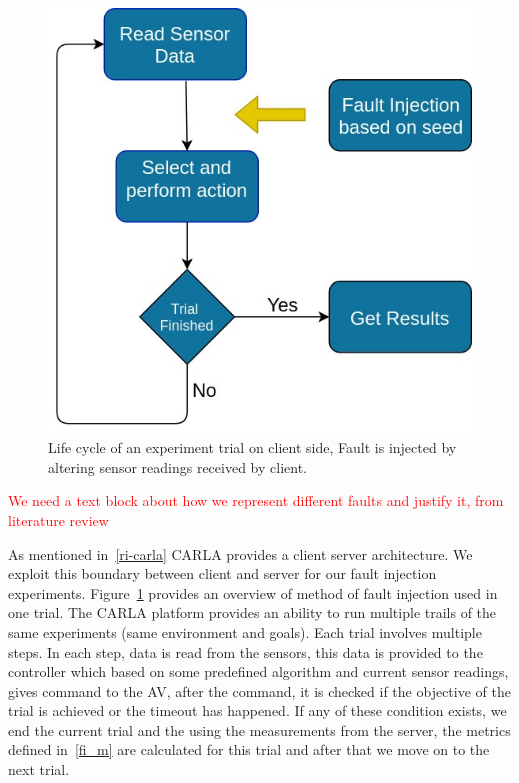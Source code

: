 \begin{figure}  
	\vspace{-0.5em}
	\centering
	\includegraphics[scale=0.3]{FI_method}
	\vspace{-0.5em}
	\caption{Life cycle of an experiment trial on client side, Fault is injected by altering sensor readings received by client.}
	\label{fig:FI_method}
	\vspace{-1.5em}
\end{figure}

\textcolor{red}{We need a text block about how we represent different faults and justify it, from literature review}

As mentioned in~\ref{ri-carla} CARLA provides a client server architecture. We exploit this boundary between client and server for our fault injection experiments. Figure~\ref{fig:FI_method} provides an overview of method of fault injection used in one trial. The CARLA platform provides an ability to run multiple trails of the same experiments (same environment and goals). Each trial involves multiple steps. In each step, data is read from the sensors, this data is provided to the controller which based on some predefined algorithm and current sensor readings, gives command to the AV, after the command, it is checked if the objective of the trial is achieved or the timeout has happened. If any of these condition exists, we end the current trial and the using the measurements from the server, the metrics defined in~\ref{fi_m} are calculated for this trial and after that we move on to the next trial. 

